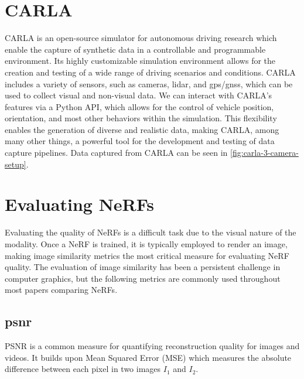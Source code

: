 \section{CARLA} \label{sec:carla}
CARLA \cite{Dosovitskiy17} is an open-source simulator for autonomous driving research which enable the capture of synthetic data in a controllable and programmable environment. Its highly customizable simulation environment allows for the creation and testing of a wide range of driving scenarios and conditions. CARLA includes a variety of sensors, such as cameras, \acrfull{lidar}, and \acrfull{gps}/\acrfull{gnss}, which can be used to collect visual and non-visual data. We can interact with CARLA’s features via a Python API, which allows for the control of vehicle position, orientation, and most other behaviors within the simulation. This flexibility enables the generation of diverse and realistic data, making CARLA, among many other things, a powerful tool for the development and testing of data capture pipelines. Data captured from CARLA can be seen in \autoref{fig:carla-3-camera-setup}.





\section{Evaluating NeRFs} \label{sec:evaluating-nerfs} 
Evaluating the quality of NeRFs is a difficult task due to the visual nature of the modality. Once a NeRF is trained, it is typically employed to render an image, making image similarity metrics the most critical measure for evaluating NeRF quality. The evaluation of image similarity has been a persistent challenge in computer graphics, but the following metrics are commonly used throughout most papers comparing NeRFs.


\subsection[PSNR]{\acrfull{psnr}}
PSNR is a common measure for quantifying reconstruction quality for images and videos. It builds upon Mean Squared Error (MSE) which measures the absolute difference between each pixel in two images $I_1$ and $I_2$.

